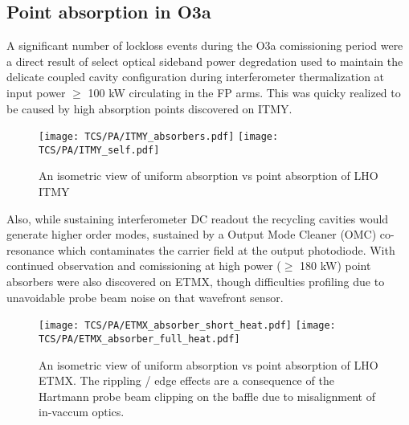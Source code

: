 
\subsection{Point absorption in O3a}
A significant number of lockloss events during the O3a comissioning period were a direct result of select optical sideband power degredation used to maintain the delicate coupled cavity configuration during interferometer thermalization at input power $\geq$ 100 kW circulating in the FP arms. This was quicky realized to be caused by high absorption points discovered on ITMY.  
\begin{figure}[H]
  \centering
  \begin{subcaptiongroup}
	  \texttt{[image: TCS/PA/ITMY\_absorbers.pdf]}
	  \label{subfig:itmypajustself}
	  \texttt{[image: TCS/PA/ITMY\_self.pdf]}
	  \label{subfig:itmypaselfplusabs}
  \end{subcaptiongroup}
  \captionsetup{subrefformat=parens}
  \vspace{-19mm}
  \caption{An isometric view of uniform absorption vs point absorption of LHO ITMY}
  \label{fig:ITMYpabs}
\end{figure}

Also, while sustaining interferometer DC readout the recycling cavities would generate higher order modes, sustained by a Output Mode Cleaner (OMC) co-resonance which contaminates the carrier field at the output photodiode. With continued observation and comissioning at high power ($\geq$ 180 kW) point absorbers were also discovered on ETMX, though difficulties profiling due to unavoidable probe beam noise on that wavefront sensor.

\begin{figure}[H]
  \centering
  \begin{subcaptiongroup}
	  \texttt{[image: TCS/PA/ETMX\_absorber\_short\_heat.pdf]}
	  \label{subfig:etmxpajustself}
	  \texttt{[image: TCS/PA/ETMX\_absorber\_full\_heat.pdf]}
	  \label{subfig:etmxpaselfplusabs}
  \end{subcaptiongroup}
  \captionsetup{subrefformat=parens}
  \vspace{-19mm}
  \caption{An isometric view of uniform absorption vs point absorption of LHO ETMX. The rippling / edge effects are a consequence of the Hartmann probe beam clipping on the baffle due to misalignment of in-vaccum optics.}
  \label{fig:ETMXpabs}
\end{figure}

